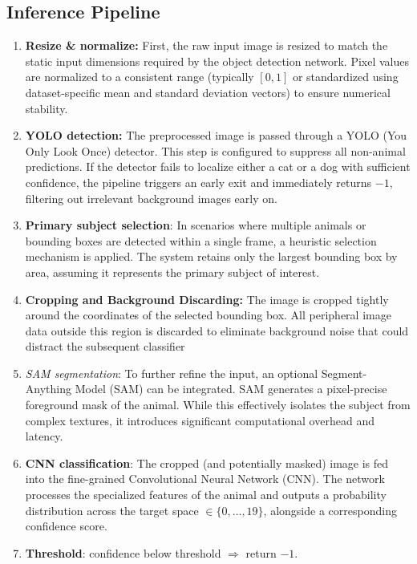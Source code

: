 \documentclass[10pt,twocolumn,letterpaper]{article}
\begin{document}
\subsection{Inference Pipeline}

\begin{enumerate}[leftmargin=*, topsep=1pt, itemsep=1pt, parsep=0pt]
  \item \textbf{Resize \& normalize:} First, the raw input image is resized to match the static input dimensions required by the object detection network. Pixel values are normalized to a consistent range (typically $[0, 1]$ or standardized using dataset-specific mean and standard deviation vectors) to ensure numerical stability.
  \item \textbf{YOLO detection:} The preprocessed image is passed through a YOLO (You Only Look Once) detector. This step is configured to suppress all non-animal predictions. If the detector fails to localize either a cat or a dog with sufficient confidence, the pipeline triggers an early exit and immediately returns $-1$, filtering out irrelevant background images early on.
  \item \textbf{Primary subject selection}: In scenarios where multiple animals or bounding boxes are detected within a single frame, a heuristic selection mechanism is applied. The system retains only the largest bounding box by area, assuming it represents the primary subject of interest.
  \item \textbf{Cropping and Background Discarding:} The image is cropped tightly around the coordinates of the selected bounding box. All peripheral image data outside this region is discarded to eliminate background noise that could distract the subsequent classifier
  \item[\textit{opt.}] \textit{SAM segmentation}: To further refine the input, an optional Segment-Anything Model (SAM) can be integrated. SAM generates a pixel-precise foreground mask of the animal. While this effectively isolates the subject from complex textures, it introduces significant computational overhead and latency.
  \item \textbf{CNN classification}: The cropped (and potentially masked) image is fed into the fine-grained Convolutional Neural Network (CNN). The network processes the specialized features of the animal and outputs a probability distribution across the target space $\in\{0,\ldots,19\}$, alongside a corresponding confidence score.
  \item \textbf{Threshold}: confidence below threshold $\Rightarrow$ return $-1$.
\end{enumerate}
\end{document}

